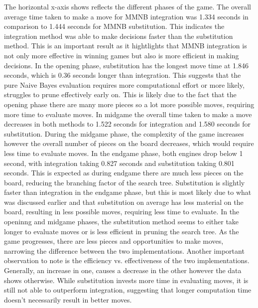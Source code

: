 The horizontal x-axis shows reflects the different phases of the game. The overall average time taken to make a move for MMNB integration was 1.334 seconds in comparison to 1.444 seconds for MMNB substitution. This indicates the integration method was able to make decisions faster than the substitution method. This is an important result as it hightlights that MMNB integration is not only more effective in winning games but also is more efficient in making decisions. In the opening phase, substitution has the longest move time at 1.846 seconds, which is 0.36 seconds longer than integration. This suggests that the pure Naive Bayes evaluation requires more computational effort or more likely, struggles to prune effectively early on. This is likely due to the fact that the opening phase there are many more pieces so a lot more possible moves, requiring more time to evaluate moves. In midgame the overall time taken to make a move decreases in both methods to 1.522 seconds for integration and 1.580 seconds for substitution. During the midgame phase, the complexity of the game increases however the overall number of pieces on the board decreases, which would require less time to evaluate moves. In the endgame phase, both engines drop below 1 second, with integration taking 0.827 seconds and substitution taking 0.801 seconds. This is expected as during endgame there are much less pieces on the board, reducing the branching factor of the search tree. Substitution is slightly faster than integration in the endgame phase,  but this is most likely due to what was discussed earlier and that substitution on average has less material on the board, resulting in less possible moves, requiring less time to evaluate. In the openinng and midgame phases, the substitution method seems to either take longer to evaluate moves or is less efficient in pruning the search tree. As the game progresses, there are less pieces and opportunities to make moves, narrowing the difference between the two implementations. Another important observation to note is the efficiency vs. effectiveness of the two implementations. Generally, an increase in one, causes a decrease in the other however the data shows otherwise. While substitution invests more time in evaluating moves, it is still not able to outperform integration, suggesting that longer computation time doesn't necessarily result in better moves. 

